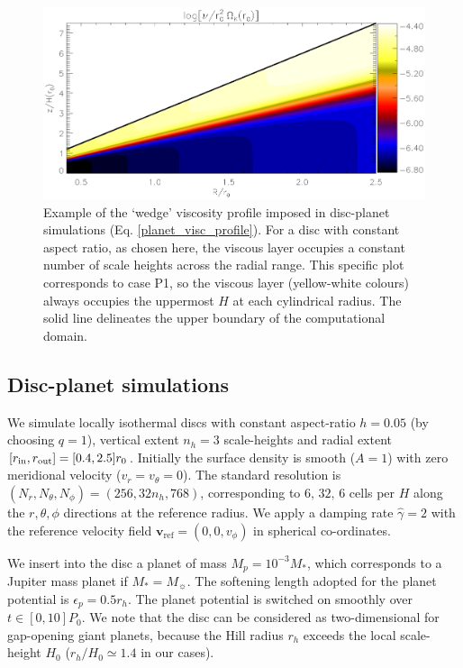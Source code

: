 \begin{figure}
  \centering
  \includegraphics[width=\linewidth]{figures/pdisk_visc2d_planet}
  \caption{Example of the `wedge' viscosity profile
    imposed in disc-planet simulations
    (Eq. \ref{planet_visc_profile}).  
    For a disc with constant aspect ratio, as chosen here, the viscous
    layer occupies a constant number of scale heights across the
    radial range. This specific plot corresponds to case P1, so the
    viscous layer (yellow-white colours) always occupies the uppermost
    $H$ at each cylindrical radius. 
    The solid line
    delineates the upper boundary of the computational domain.
    \label{planet_visc2d}}
\end{figure}

\subsection{Disc-planet simulations} 
We simulate locally isothermal discs with constant aspect-ratio
$h=0.05$ (by choosing $q=1$), vertical extent $n_h=3$ scale-heights 
and radial extent $[r_\mathrm{in},r_\mathrm{out}]=[0.4,2.5]r_0$. Initially the surface density is smooth
($A=1$) with zero meridional velocity ($v_r=v_\theta=0$). 
The standard resolution is $(N_r, N_\theta,
N_\phi)=(256, 32n_h, 768)$, corresponding to $6,\,32,\,6$ 
cells per $H$ along the $r,\theta,\phi$ directions at the reference
radius. We apply a damping rate $\hat{\gamma}=2$ with the reference
velocity field $\bm{v}_\mathrm{ref}=(0,0,v_\phi)$ in spherical
co-ordinates.   

We insert into the disc a planet of mass  
$M_p=10^{-3}M_*$, which corresponds to a Jupiter mass planet if
$M_*=M_{\sun}$. The softening length adopted for the planet potential is
$\epsilon_p=0.5r_h$. The planet potential is switched on 
smoothly over $t\in[0,10]P_0$. We note that the disc can be considered
as two-dimensional for gap-opening giant planets, because the Hill
radius $r_h$ exceeds the local scale-height $H_0$ ($r_h/H_0\simeq1.4$
in our cases).   

